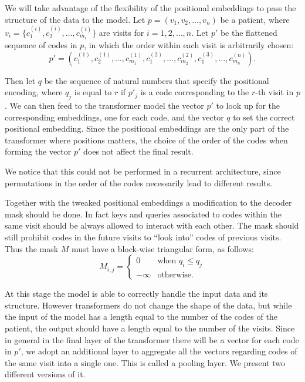 \documentclass[]{marticle}
\begin{document}
We will take advantage of the flexibility of the positional embeddings to pass the structure of the
data to the model. Let $p=(v_1, v_2, \dots, v_n)$ be a patient, where $v_i=\{c^{(i)}_1, c^{(i)}_2,
\dots, c^{(i)}_{m_i}\}$ are visits for $i=1,2,\dots, n$. Let $p'$ be the flattened sequence of codes
in $p$, in which the order within each visit is arbitrarily chosen:
\begin{equation*}
    p' = (c^{(1)}_1, c^{(1)}_2, \dots, c^{(1)}_{m_1}, c^{(2)}_1, \dots, c^{(2)}_{m_2}, c^{(3)}_1,
    \dots, c^{(n)}_{m_n}).
\end{equation*}

Then let $q$ be the sequence of natural numbers that specify the positional encoding, where $q_j$ is
equal to $r$ if $p'_j$ is a code corresponding to the $r$-th visit in $p$. We can then feed to the
transformer model the vector $p'$ to look up for the corresponding embeddings, one for each code,
and the vector $q$ to set the correct positional embedding. Since the positional embeddings are the
only part of the transformer where positions matters, the choice of the order of the codes when
forming the vector $p'$ does not affect the final result.

We notice that this could not be performed in a recurrent architecture, since permutations in the
order of the codes necessarily lead to different results.

Together with the tweaked positional embeddings a modification to the decoder mask should be done.
In fact keys and queries associated to codes within the same visit should be always allowed to
interact with each other. The mask should still prohibit codes in the future visits to ``look
into'' codes of previous visits. Thus the mask $M$ must have a block-wise triangular form, as
follows:
\begin{equation*}
    M_{i,j} = \begin{cases}
        0       & \text{when $q_i\leq q_j$} \\
        -\infty & \text{otherwise.}
    \end{cases}
\end{equation*}

At this stage the model is able to correctly handle the input data and its structure. However
transformers do not change the shape of the data, but while the input of the model has a length
equal to the number of the codes of the patient, the output should have a length equal to the number
of the visits. Since in general in the final layer of the transformer there will be a vector for
each code in $p'$, we adopt an additional layer to aggregate all the vectors regarding codes of the
same visit into a single one. This is called a pooling layer. We present two different versions of
it.
\end{document}
